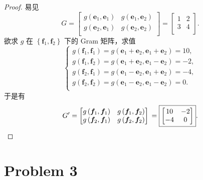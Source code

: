 \begin{proof}
易见
\[
G = \begin{bmatrix}
    g \left(\boldsymbol{e}_1, \boldsymbol{e}_1\right) & g \left(\boldsymbol{e}_1, \boldsymbol{e}_2\right) \\
    g \left(\boldsymbol{e}_2, \boldsymbol{e}_1\right) & g \left(\boldsymbol{e}_2, \boldsymbol{e}_2\right) \\
\end{bmatrix} = \boxed{\begin{bmatrix}
    1 & 2 \\
    3 & 4 \\
\end{bmatrix}}.
\]
欲求 $g$ 在 $\left\{\boldsymbol{f}_1, \boldsymbol{f}_2\right\}$ 下的 Gram 矩阵，求值
\[
\begin{cases}
    g \left(\boldsymbol{f}_1, \boldsymbol{f}_1\right) = g \left(\boldsymbol{e}_1 + \boldsymbol{e}_2, \boldsymbol{e}_1 + \boldsymbol{e}_2\right) = 10, \\
    g \left(\boldsymbol{f}_1, \boldsymbol{f}_2\right) = g \left(\boldsymbol{e}_1 + \boldsymbol{e}_2, \boldsymbol{e}_1 - \boldsymbol{e}_2\right) = -2, \\
    g \left(\boldsymbol{f}_2, \boldsymbol{f}_1\right) = g \left(\boldsymbol{e}_1 - \boldsymbol{e}_2, \boldsymbol{e}_1 + \boldsymbol{e}_2\right) = -4, \\
    g \left(\boldsymbol{f}_2, \boldsymbol{f}_2\right) = g \left(\boldsymbol{e}_1 - \boldsymbol{e}_2, \boldsymbol{e}_1 - \boldsymbol{e}_2\right) = 0. \\
\end{cases}
\]
于是有
\[
G^\prime = \begin{bmatrix}
    g \left(\boldsymbol{f}_1, \boldsymbol{f}_1\right) & g \left(\boldsymbol{f}_1, \boldsymbol{f}_2\right) \\
    g \left(\boldsymbol{f}_2, \boldsymbol{f}_1\right) & g \left(\boldsymbol{f}_2, \boldsymbol{f}_2\right) \\
\end{bmatrix} \\
= \boxed{\begin{bmatrix}
    10 & -2 \\
    -4 & 0 \\
\end{bmatrix}}.
\]

\end{proof}
\section*{Problem 3}

